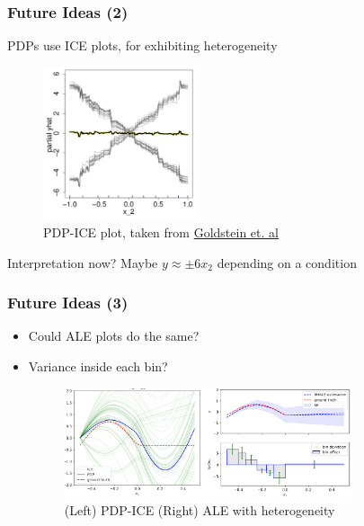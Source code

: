 \documentclass{beamer}
\begin{document}
\begin{frame}
  \frametitle{Future Ideas (2)}
  PDPs use ICE plots, for exhibiting heterogeneity
  \begin{figure}
    \centering
    \includegraphics[width=0.4\textwidth]{figures/pdp_ice}
    \caption{PDP-ICE plot, taken from \href{https://arxiv.org/abs/1309.6392}{Goldstein et. al}}
  \end{figure}
  \noindent\makebox[\linewidth]{\rule{\paperwidth}{0.4pt}}
  Interpretation now? Maybe $y \approx \pm 6 x_2 $ depending on a condition
\end{frame}

\begin{frame}
  \frametitle{Future Ideas (3)}
  \begin{itemize}
  \item Could ALE plots do the same?
  \item Variance inside each bin?
  \begin{figure}
    \centering
    \includegraphics[width=0.8\textwidth]{figures/rhale}
    \caption{(Left) PDP-ICE (Right) ALE with heterogeneity}
  \end{figure}
  \end{itemize}
\end{frame}
\end{document}
